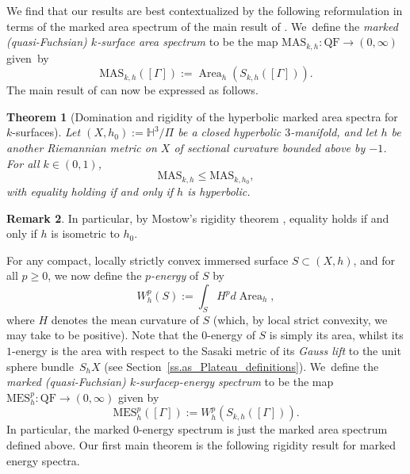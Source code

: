 \documentclass[11pt]{article}
\newcommand{\ksurface}{$k$\nobreakdash-surface\xspace}
\newcommand{\ksurfaces}{$k$\nobreakdash-surfaces\xspace}
\theoremstyle{plain}
\newtheorem{theorem}{Theorem}[section]
\theoremstyle{definition}
\newtheorem{remark}[theorem]{Remark}
\newcommand\Hyp{\mathbb{H}^3}
\let\dans\subset
\newcommand{\QF}{\mathrm{QF}}
\DeclareMathOperator{\Area}{Area}
\begin{document}
We find that our results are best contextualized by the following reformulation in terms of the marked area spectrum of the main result of \cite{ALS}. We~define the \emph{marked (quasi-Fuchsian) \ksurface area spectrum} to be the map $\text{MAS}_{k,h}:\QF\to(0,\infty)$ given~by
\begin{equation*}
\text{MAS}_{k,h}([\Gamma]) := \Area_h(S_{k,h}([\Gamma])).
\end{equation*}
The main result of \cite{ALS} can now be expressed as follows.

\begin{theorem}[Domination and rigidity of the hyperbolic marked area spectra for \ksurfaces]\label{th.rigidity_area}
Let $(X,h_0):=\Hyp/\Pi$ be a closed hyperbolic $3$\nobreakdash-manifold, and let $h$ be another Riemannian metric on $X$ of sectional curvature bounded above by $-1$. For all $k\in(0,1)$,
\begin{equation}\label{eqn.rigidity_area}
\mathrm{MAS}_{k,h}\leq\mathrm{MAS}_{k,h_0},
\end{equation}
with equality holding if and only if $h$ is hyperbolic.
\end{theorem}

\begin{remark} In particular, by Mostow's rigidity theorem \cite{Mostow}, equality holds if and only if $h$ is isometric to $h_0$.
\end{remark}

For any compact, locally strictly convex immersed surface $S\dans (X,h)$, and for all $p\geq 0$, we now define the \emph{$p$-energy} of $S$ by
\begin{equation}\label{eq.energy}
W^p_h(S):=\int_SH^pd\Area_h,
\end{equation}
where $H$ denotes the mean curvature of $S$ (which, by local strict convexity, we may take to be positive). Note that the $0$-energy of $S$ is simply its area, whilst its $1$-energy is the area with respect to the Sasaki metric of its \emph{Gauss lift} to the unit sphere bundle~$S_hX$ (see Section~\ref{ss.as_Plateau_definitions}). We~define the \emph{marked (quasi-Fuchsian) \ksurface $p$-energy spectrum} to be the map $\text{MES}_h^p:\QF\to(0,\infty)$ given by
\begin{equation}\label{eq.MarkedEnergySpectrum}
\text{MES}_h^p([\Gamma]) := W^p_h(S_{k,h}([\Gamma])).
\end{equation}
In particular, the marked $0$-energy spectrum is just the marked area spectrum defined above. Our first main theorem is the following rigidity result for marked energy spectra.
\end{document}
